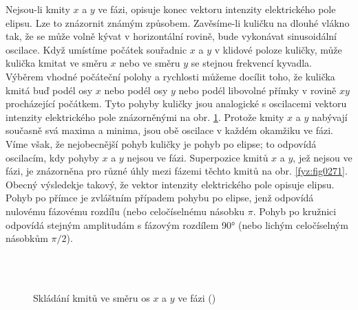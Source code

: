     Nejsou-li kmity \(x\) a \(y\) ve fázi, opisuje konec vektoru intenzity elektrického pole elipsu.
    Lze to znázornit známým způsobem. Zavěsíme-li kuličku na dlouhé vlákno tak, že se může volně
    kývat v horizontální rovině, bude vykonávat sinusoidální oscilace. Když umístíme počátek
    souřadnic \(x\) a \(y\) v klidové poloze kuličky, může kulička kmitat ve směru \(x\) nebo ve
    směru \(y\) se stejnou frekvencí kyvadla. Výběrem vhodné počáteční polohy a rychlosti můžeme
    docílit toho, že kulička kmitá buď podél osy \(x\) nebo podél osy \(y\) nebo podél libovolné
    přímky v rovině \(xy\) procházející počátkem. Tyto pohyby kuličky jsou analogické s oscilacemi
    vektoru intenzity elektrického pole znázorněnými na obr. \ref{fyz:fig0270}. Protože kmity \(x\) a
    \(y\) nabývají současně svá maxima a minima, jsou obě oscilace v každém okamžiku ve fázi. Víme
    však, že nejobecnější pohyb kuličky je pohyb po elipse; to odpovídá oscilacím, kdy pohyby \(x\)
    a \(y\) nejsou ve fázi. Superpozice kmitů \(x\) a \(y\), jež nejsou ve fázi, je znázorněna pro
    různé úhly mezi fázemi těchto kmitů na obr. \ref{fyz:fig0271}. Obecný výsledekje takový, že
    vektor intenzity elektrického pole opisuje elipsu. Pohyb po přímce je zvláštním případem pohybu
    po elipse, jenž odpovídá nulovému fázovému rozdílu (nebo celočíselnému násobku \(\pi\). Pohyb po
    kružnici odpovídá stejným amplitudám s fázovým rozdílem \ang{90} (nebo lichým celočíselným
    násobkům \(\pi/2\)).

    \begin{figure}[ht!]  %
      \centering
        {}               
        {}                                                 \\
        {}                         
        {}                                                 \\         
        {}                         
        {}
      \caption{Skládání kmitů ve směru os \(x\) a \(y\) ve fázi (\cite[s.~437]{Feynman01})}
      \label{fyz:fig0270}
    \end{figure}

